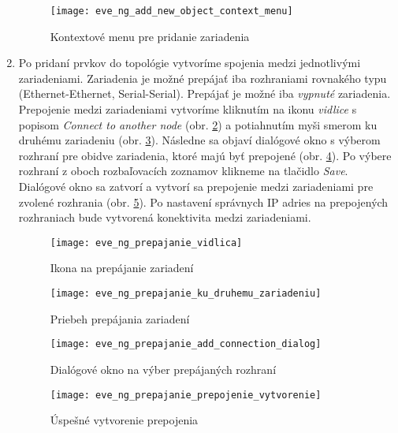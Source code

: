 \begin{enumerate}[noitemsep]
\begin{figure}
    \centering
    \texttt{[image: eve\_ng\_add\_new\_object\_context\_menu]}
    \caption{Kontextové menu pre pridanie zariadenia}
    \label{obr:eve_ng_add_new_object_context_menu}
\end{figure}
    
    \item Po pridaní prvkov do topológie vytvoríme spojenia medzi jednotlivými zariadeniami. Zariadenia je možné prepájať iba rozhraniami rovnakého typu (Ethernet-Ethernet, Serial-Serial). Prepájať je možné iba \emph{vypnuté} zariadenia. Prepojenie medzi zariadeniami vytvoríme kliknutím na ikonu \emph{vidlice} s popisom \emph{Connect to another node} (obr. \ref{obr:eve_ng_prepajanie_vidlica}) a potiahnutím myši smerom ku druhému zariadeniu (obr. \ref{obr:eve_ng_prepajanie_ku_druhemu_zariadeniu}). Následne sa objaví dialógové okno s výberom rozhraní pre obidve zariadenia, ktoré majú byť prepojené (obr. \ref{obr:eve_ng_prepajanie_add_connection_dialog}). Po výbere rozhraní z oboch rozbaľovacích zoznamov klikneme na tlačidlo \emph{Save}. Dialógové okno sa zatvorí a vytvorí sa prepojenie medzi zariadeniami pre zvolené rozhrania (obr. \ref{obr:eve_ng_prepajanie_prepojenie_vytvorenie}). Po nastavení správnych IP adries na prepojených rozhraniach bude vytvorená konektivita medzi zariadeniami.
    
    \begin{figure}
        \centering
        \texttt{[image: eve\_ng\_prepajanie\_vidlica]}
        \caption{Ikona na prepájanie zariadení}
        \label{obr:eve_ng_prepajanie_vidlica}
    \end{figure}
    
    \begin{figure}
        \centering
        \texttt{[image: eve\_ng\_prepajanie\_ku\_druhemu\_zariadeniu]}
        \caption{Priebeh prepájania zariadení}
        \label{obr:eve_ng_prepajanie_ku_druhemu_zariadeniu}
    \end{figure}
    
    \begin{figure}
        \centering
        \texttt{[image: eve\_ng\_prepajanie\_add\_connection\_dialog]}
        \caption{Dialógové okno na výber prepájaných rozhraní}
        \label{obr:eve_ng_prepajanie_add_connection_dialog}
    \end{figure}
    
    \begin{figure}
        \centering
        \texttt{[image: eve\_ng\_prepajanie\_prepojenie\_vytvorenie]}
        \caption{Úspešné vytvorenie prepojenia}
        \label{obr:eve_ng_prepajanie_prepojenie_vytvorenie}
    \end{figure}
    

\end{enumerate}
